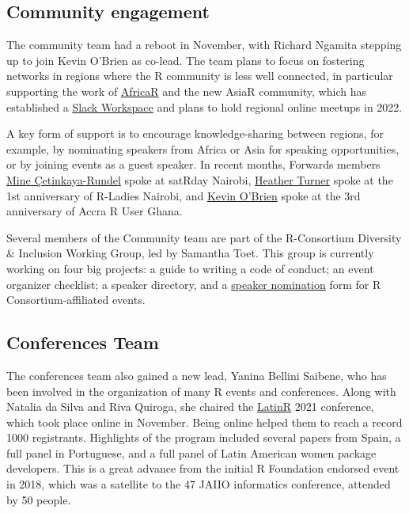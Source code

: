 \hypertarget{community-engagement}{%
\subsection{Community engagement}\label{community-engagement}}

The community team had a reboot in November, with Richard Ngamita stepping up to join Kevin O'Brien as co-lead. The team plans to focus on fostering networks in regions where the R community is less well connected, in particular supporting the work of \href{https://africa-r.org/}{AfricaR} and the new AsiaR community, which has established a \href{https://bit.ly/join_asiaR_slack}{Slack Workspace} and plans to hold regional online meetups in 2022.

A key form of support is to encourage knowledge-sharing between regions, for example, by nominating speakers from Africa or Asia for speaking opportunities, or by joining events as a guest speaker. In recent months, Forwards members \href{https://twitter.com/minebocek/status/1434173671313190913}{Mine Çetinkaya-Rundel} spoke at satRday Nairobi, \href{https://twitter.com/HeathrTurnr/status/1459495802850746370}{Heather Turner} spoke at the 1st anniversary of R-Ladies Nairobi, and \href{https://twitter.com/RUsersGhana/status/1482079597214773248}{Kevin O'Brien} spoke at the 3rd anniversary of Accra R User Ghana.

Several members of the Community team are part of the R-Consortium Diversity \& Inclusion Working Group, led by Samantha Toet. This group is currently working on four big projects: a guide to writing a code of conduct; an event organizer checklist; a speaker directory, and a \href{https://www.r-consortium.org/blog/2021/07/14/r-consortium-diversity-inclusion-speaker-nomination}{speaker nomination} form for R Consortium-affiliated events.

\hypertarget{conferences-team}{%
\subsection{Conferences Team}\label{conferences-team}}

The conferences team also gained a new lead, Yanina Bellini Saibene, who has been involved in the organization of many R events and conferences. Along with Natalia da Silva and Riva Quiroga, she chaired the \href{https://latin-r.com/en}{LatinR} 2021 conference, which took place online in November. Being online helped them to reach a record 1000 registrants. Highlights of the program included several papers from Spain, a full panel in Portuguese, and a full panel of Latin American women package developers. This is a great advance from the initial R Foundation endorsed event in 2018, which was a satellite to the 47 JAIIO informatics conference, attended by 50 people.

